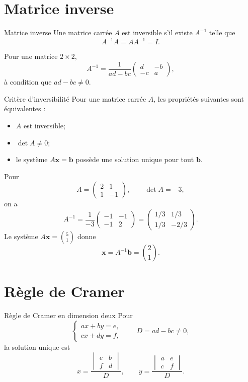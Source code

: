 \section{Matrice inverse}
\label{manual:section:12.05}

\begin{definition}{Matrice inverse}{}
Une matrice carrée $A$ est inversible s'il existe $A^{-1}$ telle que
\[
A^{-1}A=AA^{-1}=I.
\]
\end{definition}

Pour une matrice $2\times2$,
\[
A^{-1}=\frac1{ad-bc}
\begin{pmatrix}d&-b\\-c&a\end{pmatrix},
\]
à condition que $ad-bc\neq0$.

\begin{theorem}{Critère d'inversibilité}{}
Pour une matrice carrée $A$, les propriétés suivantes sont équivalentes :
\begin{itemize}
\item $A$ est inversible;
\item $\det A\neq0$;
\item le système $A\mathbf x=\mathbf b$ possède une solution unique pour tout $\mathbf b$.
\end{itemize}
\end{theorem}

\begin{examplebox}
Pour
\[
A=\begin{pmatrix}2&1\\1&-1\end{pmatrix},
\qquad \det A=-3,
\]
on a
\[
A^{-1}=\frac1{-3}\begin{pmatrix}-1&-1\\-1&2\end{pmatrix}
=\begin{pmatrix}1/3&1/3\\1/3&-2/3\end{pmatrix}.
\]
Le système $A\mathbf x=\binom51$ donne
\[
\mathbf x=A^{-1}\mathbf b=\binom21.
\]
\end{examplebox}

\section{Règle de Cramer}
\label{manual:section:12.06}

\begin{theorem}{Règle de Cramer en dimension deux}{}
Pour
\[
\begin{cases}
ax+by=e,\\
cx+dy=f,
\end{cases}
\qquad D=ad-bc\neq0,
\]
la solution unique est
\[
x=\frac{\begin{vmatrix}e&b\\f&d\end{vmatrix}}{D},
\qquad
y=\frac{\begin{vmatrix}a&e\\c&f\end{vmatrix}}{D}.
\]
\end{theorem}


